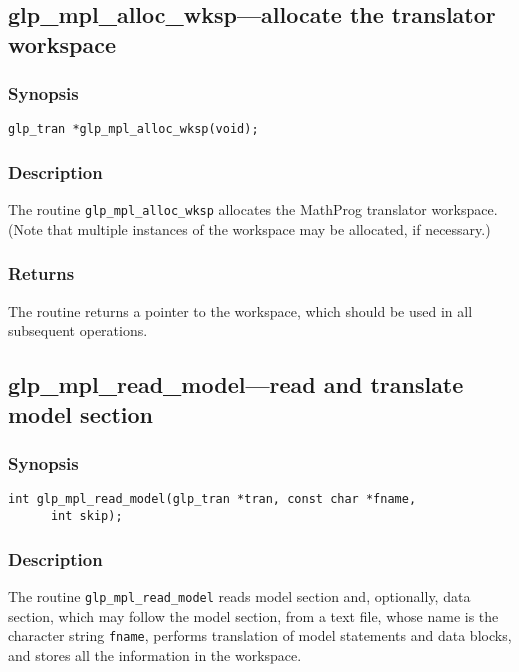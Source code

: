 \subsection{glp\_mpl\_alloc\_wksp---allocate the translator workspace}

\subsubsection*{Synopsis}

\begin{verbatim}
glp_tran *glp_mpl_alloc_wksp(void);
\end{verbatim}

\subsubsection*{Description}

The routine \verb|glp_mpl_alloc_wksp| allocates the MathProg translator
work\-space. (Note that multiple instances of the workspace may be
allocated, if necessary.)

\subsubsection*{Returns}

The routine returns a pointer to the workspace, which should be used in
all subsequent operations.

\subsection{glp\_mpl\_read\_model---read and translate model section}

\subsubsection*{Synopsis}

\begin{verbatim}
int glp_mpl_read_model(glp_tran *tran, const char *fname,
      int skip);
\end{verbatim}

\subsubsection*{Description}

The routine \verb|glp_mpl_read_model| reads model section and,
optionally, data section, which may follow the model section, from a
text file, whose name is the character string \verb|fname|, performs
translation of model statements and data blocks, and stores all the
information in the workspace.

